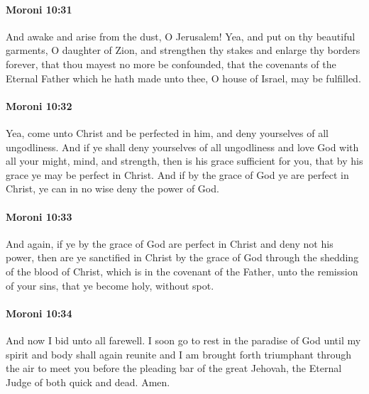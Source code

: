 		\paragraph{Moroni 10:31} %
			\label{MORONI-10-31}

			And awake and arise from the dust, O Jerusalem!
			Yea, and put on thy beautiful garments, O daughter of Zion,
			and strengthen thy stakes and enlarge thy borders forever,
			that thou mayest no more be confounded,
			that the covenants of the Eternal Father
			which he hath made unto thee, O house of Israel,
			may be fulfilled.

		\paragraph{Moroni 10:32} %
			\label{MORONI-10-32}

			Yea, come unto Christ and be perfected in him,
			and deny yourselves of all ungodliness.
			And if ye shall deny yourselves of all ungodliness
			and love God with all your might, mind, and strength,
			then is his grace sufficient for you,
			that by his grace ye may be perfect in Christ.
			And if by the grace of God ye are perfect in Christ,
			ye can in no wise deny the power of God.

		\paragraph{Moroni 10:33} %
			\label{MORONI-10-33}

			And again, if ye by the grace of God are perfect in Christ
			and deny not his power,
			then are ye sanctified in Christ by the grace of God
			through the shedding of the blood of Christ,
			which is in the covenant of the Father,
			unto the remission of your sins,
			that ye become holy, without spot.

		\paragraph{Moroni 10:34} %
			\label{MORONI-10-34}

			And now I bid unto all farewell.
			I soon go to rest in the paradise of God
			until my spirit and body shall again reunite
			and I am brought forth triumphant through the air
			to meet you before the pleading bar of the great Jehovah,
			the Eternal Judge of both quick and dead.
			Amen.